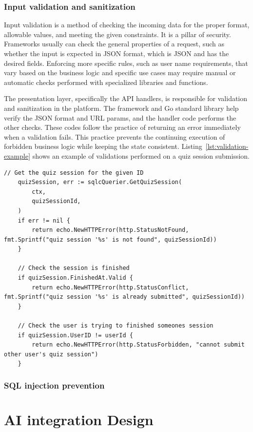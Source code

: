 \subsubsection{Input validation and sanitization}

Input validation is a method of checking the incoming data for the proper format, allowable values, and meeting the given constraints. It is a pillar of security. Frameworks usually can check the general properties of a request, such as whether the input is expected in JSON format, which is JSON and has the desired fields. Enforcing more specific rules, such as user name requirements, that vary based on the business logic and specific use cases may require manual or automatic checks performed with specialized libraries and functions.

The presentation layer, specifically the API handlers, is responsible for validation and sanitization in the platform. The framework and Go standard library help verify the JSON format and URL params, and the handler code performs the other checks. These codes follow the practice of returning an error immediately when a validation fails. This practice prevents the continuing execution of forbidden business logic while keeping the state consistent. Listing~\ref{lst:validation-example} shows an example of validations performed on a quiz session submission.

\begin{lstlisting}[caption=Validation example,label=lst:validation-example]
    // Get the quiz session for the given ID
    quizSession, err := sqlcQuerier.GetQuizSession(
        ctx,
        quizSessionId,
    )
    if err != nil {
        return echo.NewHTTPError(http.StatusNotFound, fmt.Sprintf("quiz session '%s' is not found", quizSessionId))
    }

    // Check the session is finished
    if quizSession.FinishedAt.Valid {
        return echo.NewHTTPError(http.StatusConflict, fmt.Sprintf("quiz session '%s' is already submitted", quizSessionId))
    }

    // Check the user is trying to finished someones session
    if quizSession.UserID != userId {
        return echo.NewHTTPError(http.StatusForbidden, "cannot submit other user's quiz session")
    }
\end{lstlisting}

\subsubsection{SQL injection prevention}

\section{AI integration Design}